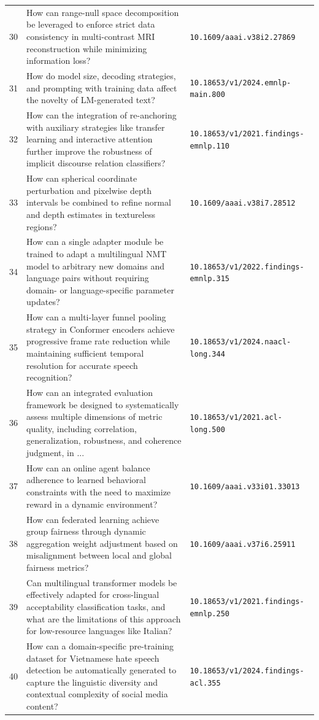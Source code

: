\documentclass[runningheads]{llncs}
\begin{document}
\begin{longtable}{@{}p{0.5cm}p{7.2cm}p{2.5cm}@{}}
30 & How can range-null space decomposition be leveraged to enforce strict data consistency in multi-contrast MRI reconstruction while minimizing information loss? & \texttt{10.1609/aaai.v38i2.27869} \\
31 & How do model size, decoding strategies, and prompting with training data affect the novelty of LM-generated text? & \texttt{10.18653/v1/2024.emnlp-main.800} \\
32 & How can the integration of re-anchoring with auxiliary strategies like transfer learning and interactive attention further improve the robustness of implicit discourse relation classifiers? & \texttt{10.18653/v1/2021.findings-emnlp.110} \\
33 & How can spherical coordinate perturbation and pixelwise depth intervals be combined to refine normal and depth estimates in textureless regions? & \texttt{10.1609/aaai.v38i7.28512} \\
34 & How can a single adapter module be trained to adapt a multilingual NMT model to arbitrary new domains and language pairs without requiring domain- or language-specific parameter updates? & \texttt{10.18653/v1/2022.findings-emnlp.315} \\
35 & How can a multi-layer funnel pooling strategy in Conformer encoders achieve progressive frame rate reduction while maintaining sufficient temporal resolution for accurate speech recognition? & \texttt{10.18653/v1/2024.naacl-long.344} \\
36 & How can an integrated evaluation framework be designed to systematically assess multiple dimensions of metric quality, including correlation, generalization, robustness, and coherence judgment, in ... & \texttt{10.18653/v1/2021.acl-long.500} \\
37 & How can an online agent balance adherence to learned behavioral constraints with the need to maximize reward in a dynamic environment? & \texttt{10.1609/aaai.v33i01.33013} \\
38 & How can federated learning achieve group fairness through dynamic aggregation weight adjustment based on misalignment between local and global fairness metrics? & \texttt{10.1609/aaai.v37i6.25911} \\
39 & Can multilingual transformer models be effectively adapted for cross-lingual acceptability classification tasks, and what are the limitations of this approach for low-resource languages like Italian? & \texttt{10.18653/v1/2021.findings-emnlp.250} \\
40 & How can a domain-specific pre-training dataset for Vietnamese hate speech detection be automatically generated to capture the linguistic diversity and contextual complexity of social media content? & \texttt{10.18653/v1/2024.findings-acl.355} \\

\end{longtable}
\end{document}
